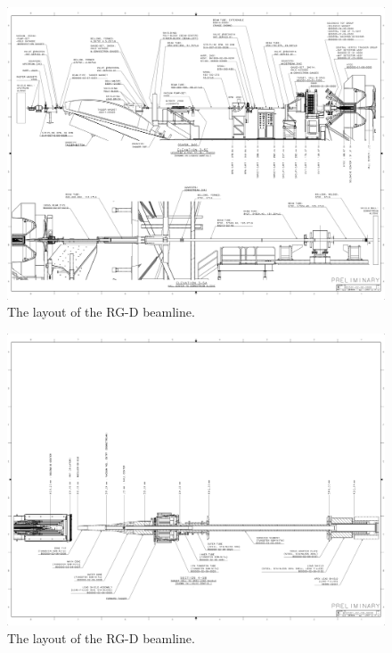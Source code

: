 \documentclass[11pt]{article}
\begin{document}
\begin{figure}[hbt]
\vspace{-2cm}
\begin{center}
\includegraphics[width=9in,angle=90]{RGD_beamline_p3.pdf}
\end{center}
\caption{ \label{fig:beamline3} 
The layout of the RG-D beamline. }
\end{figure}

\begin{figure}[hbt]
\vspace{-2cm}
\begin{center}
\includegraphics[width=9in,angle=90]{RGD_beamline_p4.pdf}
\end{center}
\caption{ \label{fig:beamline4}
The layout of the RG-D beamline.}
\end{figure}
\end{document}

